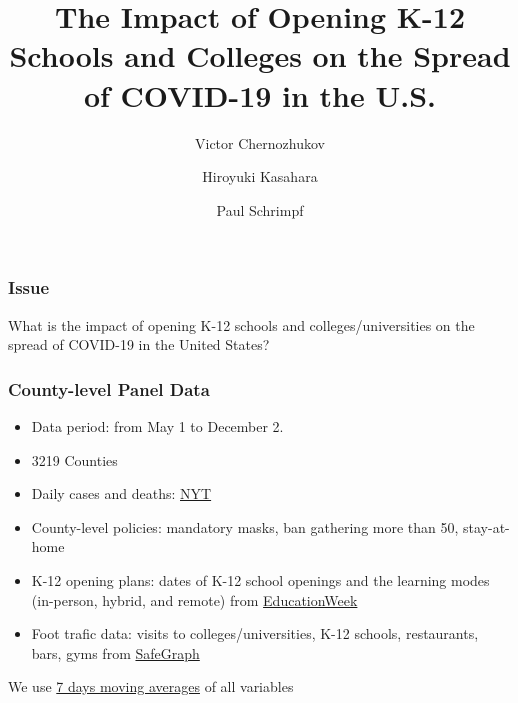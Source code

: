 \documentclass{beamer}
\title[Impact of K-12 Schools and College Openings]
{The Impact of Opening K-12 Schools and Colleges on the Spread of COVID-19 in the U.S.}
\author[Victor Chernozhukov, Hiroyuki Kasahara, Paul Schrimpf] %
{Victor Chernozhukov\inst{1} \and Hiroyuki Kasahara\inst{2} \and Paul Schrimpf\inst{2}}
\institute[] %
{
  \inst{1}%
  Department of Economics and Center for Statistics and Data Science, MIT
  \and
  \inst{2}%
  Vancouver School of Economics,
  UBC }
\date[January 2021] %
{}
\def\bcolor{\color{forestgreen(web)}}
\def\pcolor{\color{blue}}
\def\wcolor{\color{gray}}
\def\ycolor{\color{red}}
\begin{document}
\begin{frame}
  \titlepage
\end{frame}



\begin{frame}
  \frametitle{Issue}%
\Large
  What is the impact of opening K-12 schools and colleges/universities on the spread of COVID-19 in the United States?
  
  
\end{frame}


 


 

\begin{frame}
  \frametitle{County-level Panel Data}\vspace{-0.05cm} 
  
  \begin{itemize}
  \item Data period: from May 1 to December 2.\medskip
  \item 3219 Counties \medskip
  \item {\ycolor Daily cases and deaths}: \underline{NYT}\medskip
  \item  {\pcolor  County-level policies}: mandatory masks, ban gathering more than 50, stay-at-home  \underline{\citep{killeen2020countylevel}}
 \medskip
   \item  {\pcolor  K-12 opening plans}: dates of K-12 school openings and the learning modes (in-person, hybrid, and remote) from \underline{EducationWeek}
 \medskip
 
\item {\pcolor  Foot trafic data}: visits to  colleges/universities, K-12 schools, restaurants, bars, gyms from \underline{SafeGraph}

  \end{itemize} 
  
We use  \underline{7 days moving averages} of all variables %
%   

\end{frame}
\end{document}
